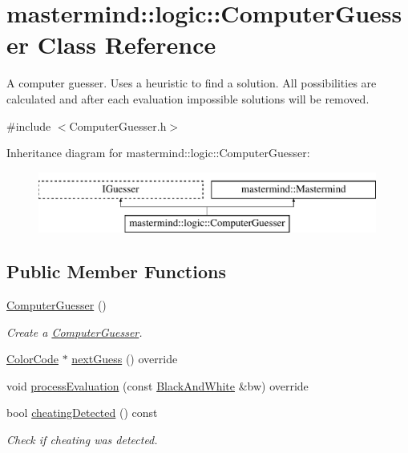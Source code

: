 \hypertarget{classmastermind_1_1logic_1_1_computer_guesser}{}\section{mastermind\+:\+:logic\+:\+:Computer\+Guesser Class Reference}
\label{classmastermind_1_1logic_1_1_computer_guesser}


A computer guesser. Uses a heuristic to find a solution. All possibilities are calculated and after each evaluation impossible solutions will be removed.  




{\ttfamily \#include $<$Computer\+Guesser.\+h$>$}

Inheritance diagram for mastermind\+:\+:logic\+:\+:Computer\+Guesser\+:\begin{figure}[H]
\begin{center}
\leavevmode
\includegraphics[height=2.000000cm]{classmastermind_1_1logic_1_1_computer_guesser}
\end{center}
\end{figure}
\subsection*{Public Member Functions}
\begin{DoxyCompactItemize}
\item 
\hyperlink{classmastermind_1_1logic_1_1_computer_guesser_a56134030aac585a8cdbe1e42d544b653}{Computer\+Guesser} ()
\begin{DoxyCompactList}\small\item\em Create a \hyperlink{classmastermind_1_1logic_1_1_computer_guesser}{Computer\+Guesser}. \end{DoxyCompactList}\item 
\hyperlink{classmastermind_1_1logic_1_1_color_code}{Color\+Code} $\ast$ \hyperlink{classmastermind_1_1logic_1_1_computer_guesser_a5553cb2d63534927fbf9031c5d40c828}{next\+Guess} () override
\item 
void \hyperlink{classmastermind_1_1logic_1_1_computer_guesser_a728f55a5700d3574fc6b9207c9e8db7d}{process\+Evaluation} (const \hyperlink{classmastermind_1_1logic_1_1_black_and_white}{Black\+And\+White} \&bw) override
\item 
bool \hyperlink{classmastermind_1_1logic_1_1_computer_guesser_ae93df46297030bcbd924f5ddc4af4889}{cheating\+Detected} () const
\begin{DoxyCompactList}\small\item\em Check if cheating was detected. \end{DoxyCompactList}\end{DoxyCompactItemize}
